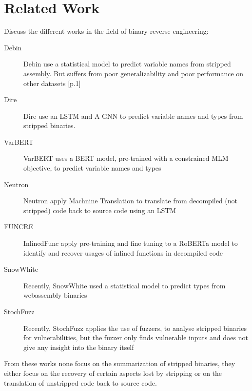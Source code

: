 \chapter{Related Work}
\label{relatedWork}
Discuss the different works in the field of binary reverse engineering:

\begin{description}
    \item[Debin] Debin use a statistical model to predict variable names from stripped assembly. But suffers from poor generalizability and poor performance on other datasets \cite{VarBERT}[p.1]
    \item[Dire] Dire use an LSTM and A GNN to predict variable names and types from stripped binaries.
    \item[VarBERT] VarBERT uses a BERT model, pre-trained with a constrained MLM objective, to predict variable names and types
    \item[Neutron] Neutron apply Machnine Translation to translate from decompiled (not stripped) code back to source code using an LSTM  
    \item[FUNCRE] InlinedFunc apply pre-training and fine tuning to a RoBERTa model to identify and recover usages of inlined functions in decompiled code
    \item[SnowWhite] Recently, SnowWhite used a statistical model to predict types from webassembly binaries
    \item[StochFuzz] Recently, StochFuzz applies the use of fuzzers, to analyse stripped binaries for vulnerabilities, but the fuzzer only finds vulnerable inputs and does not give any insight into the binary itself
\end{description}

From these works none focus on the summarization of stripped binaries, they either focus on the recovery of certain aspects lost by stripping or on the translation of unstripped code back to source code.